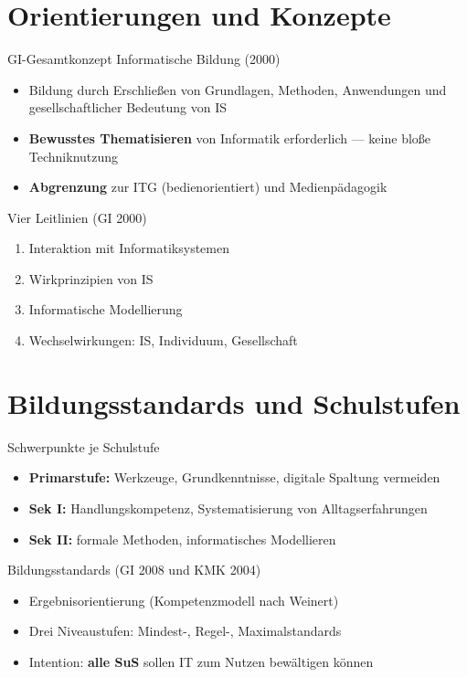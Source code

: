 \documentclass{article}
\begin{document}
\section{Orientierungen und Konzepte}
\begin{block}{GI-Gesamtkonzept Informatische Bildung (2000)}
    \begin{itemize}
        \item Bildung durch Erschließen von Grundlagen, Methoden, Anwendungen und gesellschaftlicher Bedeutung von IS
        \item \textbf{Bewusstes Thematisieren} von Informatik erforderlich — keine bloße Techniknutzung
        \item \textbf{Abgrenzung} zur ITG (bedienorientiert) und Medienpädagogik
    \end{itemize}
\end{block}

\begin{block}{Vier Leitlinien (GI 2000)}
    \begin{enumerate}
        \item Interaktion mit Informatiksystemen
        \item Wirkprinzipien von IS
        \item Informatische Modellierung
        \item Wechselwirkungen: IS, Individuum, Gesellschaft
    \end{enumerate}
\end{block}

\section{Bildungsstandards und Schulstufen}

\begin{block}{Schwerpunkte je Schulstufe}
    \begin{itemize}
        \item \textbf{Primarstufe:} Werkzeuge, Grundkenntnisse, digitale Spaltung vermeiden
        \item \textbf{Sek I:} Handlungskompetenz, Systematisierung von Alltagserfahrungen
        \item \textbf{Sek II:} formale Methoden, informatisches Modellieren
    \end{itemize}
\end{block}

\begin{block}{Bildungsstandards (GI 2008 und KMK 2004)}
    \begin{itemize}
        \item Ergebnisorientierung (Kompetenzmodell nach Weinert)
        \item Drei Niveaustufen: Mindest-, Regel-, Maximalstandards
        \item Intention: \textbf{alle SuS} sollen IT zum Nutzen bewältigen können
    \end{itemize}
\end{block}
\end{document}
